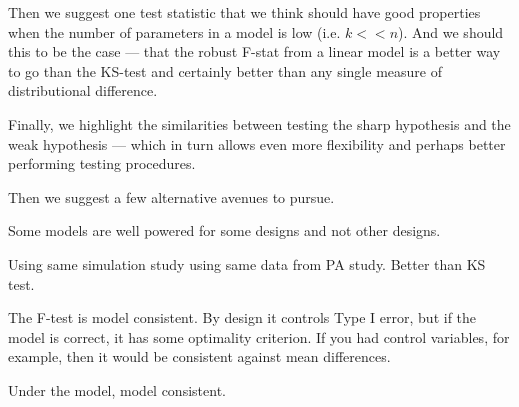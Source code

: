 \documentclass[12pt]{article}
\begin{document}
Then we suggest one test statistic that we think should have good properties
when the number of parameters in a model is low (i.e. $k << n$). And we should
this to be the case --- that the robust F-stat from a linear model is a better
way to go than the KS-test and certainly better than any single measure of
distributional difference.

Finally, we highlight the similarities between testing the sharp hypothesis
and the weak hypothesis --- which in turn allows even more flexibility and
perhaps better performing testing procedures.


Then we suggest a few alternative avenues to pursue.

Some models are well powered for some designs and not other designs.

Using same simulation study using same data from PA study. Better than KS
test. 

The F-test is model consistent. By design it controls Type I error, but if the
model is correct, it has some optimality criterion. If you had control
variables, for example, then it would be consistent against mean differences.

Under the model, model consistent.






\end{document}
